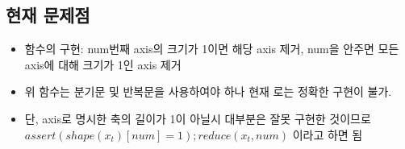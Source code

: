 \documentclass{article}
\begin{document}
\subsection{현재 문제점}
\begin{itemize}
\item {} 함수의 구현: num번째 axis의 크기가 1이면 해당 axis 제거, num을 안주면 모든 axis에 대해 크기가 1인 axis 제거
\item 위 함수는 분기문 및 반복문을 사용하여야 하나 현재 로는 정확한 구현이 불가.
\item 단, axis로 명시한 축의 길이가 1이 아닐시 대부분은 잘못 구현한 것이므로 $assert(shape(x_t)[num] = 1); reduce(x_t, num)$ 이라고 하면 됨
\end{itemize}

\end{document}
